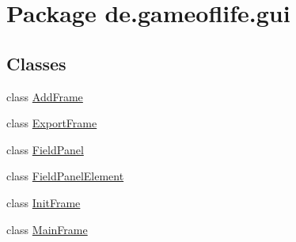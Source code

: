 \hypertarget{namespacede_1_1gameoflife_1_1gui}{\section{Package de.\-gameoflife.\-gui}
\label{namespacede_1_1gameoflife_1_1gui}
}
\subsection*{Classes}
\begin{DoxyCompactItemize}
\item 
class \hyperlink{classde_1_1gameoflife_1_1gui_1_1AddFrame}{Add\-Frame}
\item 
class \hyperlink{classde_1_1gameoflife_1_1gui_1_1ExportFrame}{Export\-Frame}
\item 
class \hyperlink{classde_1_1gameoflife_1_1gui_1_1FieldPanel}{Field\-Panel}
\item 
class \hyperlink{classde_1_1gameoflife_1_1gui_1_1FieldPanelElement}{Field\-Panel\-Element}
\item 
class \hyperlink{classde_1_1gameoflife_1_1gui_1_1InitFrame}{Init\-Frame}
\item 
class \hyperlink{classde_1_1gameoflife_1_1gui_1_1MainFrame}{Main\-Frame}
\end{DoxyCompactItemize}
